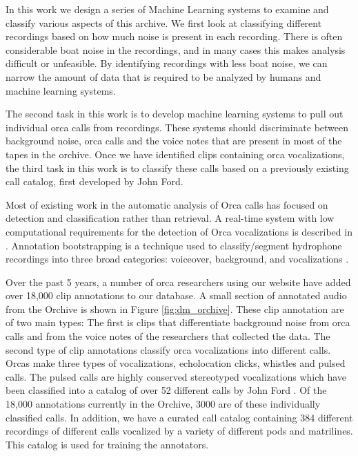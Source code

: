 \documentclass[12pt,oneside]{book}
\begin{document}
In this work we design a series of Machine Learning systems to examine
and classify various aspects of this archive.  We first look at
classifying different recordings based on how much noise is present in
each recording.  There is often considerable boat noise in the
recordings, and in many cases this makes analysis difficult or
unfeasible.  By identifying recordings with less boat noise, we can
narrow the amount of data that is required to be analyzed by humans
and machine learning systems.

The second task in this work is to develop machine learning systems to
pull out individual orca calls from recordings.  These systems should
discriminate between background noise, orca calls and the voice notes
that are present in most of the tapes in the orchive.  Once we have
identified clips containing orca vocalizations, the third task in this
work is to classify these calls based on a previously existing call
catalog, first developed by John Ford.


Most of existing work in the automatic analysis of Orca calls has
focused on detection and classification rather than retrieval. A
real-time system with low computational requirements for the detection
of Orca vocalizations is described in \cite{Luke2010771}. Annotation
bootstrapping is a technique used to classify/segment hydrophone
recordings into three broad categories: voiceover, background, and
vocalizations \cite{ness08}. 

Over the past 5 years, a number of orca researchers using our website
have added over 18,000 clip annotations to our database.  A small
section of annotated audio from the Orchive is shown in Figure
\ref{fig:dm_orchive}.  These clip annotation are of two main types:
The first is clips that differentiate background noise from orca calls
and from the voice notes of the researchers that collected the data.
The second type of clip annotations classify orca vocalizations into
different calls.  Orcas make three types of vocalizations,
echolocation clicks, whistles and pulsed calls.  The pulsed calls are
highly conserved stereotyped vocalizations which have been classified
into a catalog of over 52 different calls by John Ford \cite{ford87}.
Of the 18,000 annotations currently in the Orchive, 3000 are of these
individually classified calls.  In addition, we have a curated call
catalog containing 384 different recordings of different calls
vocalized by a variety of different pods and matrilines. This catalog
is used for training the annotators.
\end{document}
